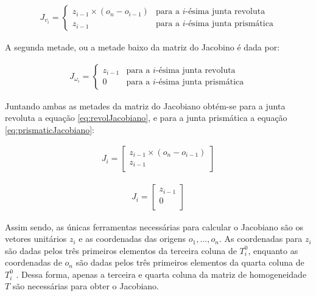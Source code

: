 \begin{equation}
  \begin{gathered}
    J_{v_i} = 
      \left\{
	\begin{array}{cl}
	  z_{i-1} \times (o_n - o_{i-1}) & \text{para a $i$-ésima junta revoluta}\\
	  z_{i-1} 			 & \text{para a $i$-ésima junta prismática}
	\end{array}
      \right.
  \end{gathered}
\end{equation}

A segunda metade, ou a metade baixo da matriz do Jacobino é dada por:

\begin{equation}
  \begin{gathered}
    J_{\omega_i} = 
      \left\{
	\begin{array}{cl}
	  z_{i-1} & \text{para a $i$-ésima junta revoluta}\\
	  0 	  & \text{para a $i$-ésima junta prismática}
	\end{array}
      \right.
  \end{gathered}
\end{equation}

Juntando ambas as metades da matriz do Jacobiano obtém-se para a junta revoluta a equação \ref{eq:revolJacobiano},
e para a junta prismática a equação \ref{eq:prismaticJacobiano}:

\begin{equation}
  \begin{gathered}
    J_i = \begin{bmatrix}
     z_{i-1} \times (o_n - o_{i-1})\\
     z_{i-1}\\
    \end{bmatrix}
  \end{gathered}
  \label{eq:revolJacobiano}
\end{equation}

\begin{equation}
  \begin{gathered}
    J_i = \begin{bmatrix}
     z_{i-1}\\
     0\\
    \end{bmatrix}
  \end{gathered}
  \label{eq:prismaticJacobiano}
\end{equation}

Assim sendo, as únicas ferramentas necessárias para calcular o Jacobiano são os 
vetores unitários $z_i$ e as coordenadas das origens $o_1, ..., o_n$. As coordenadas
para $z_i$ são dadas pelos três primeiros elementos da terceira coluna de $T^0_i$, 
enquanto as coordenadas de $o_n$ são dadas pelos três primeiros elementos da quarta
coluna de $T^0_i$ . Dessa forma, apenas a terceira e quarta coluna da matriz de 
homogeneidade $T$ são necessárias para obter o Jacobiano. \cite{Spong}

